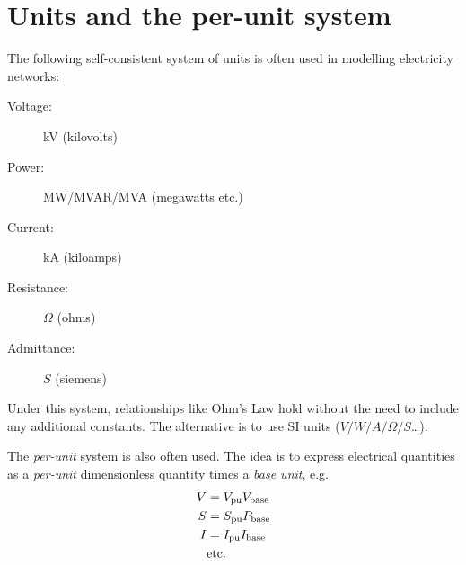 \documentclass[10pt]{article}
\begin{document}
\section{Units and the per-unit system}
The following self-consistent system of units is often used in modelling electricity networks:
\begin{description}
	\item[Voltage:]kV (kilovolts)
	\item[Power:]MW/MVAR/MVA (megawatts etc.)
	\item[Current:]kA (kiloamps)
	\item[Resistance:]$\Omega$ (ohms)
	\item[Admittance:]$S$ (siemens)
\end{description}
Under this system, relationships like Ohm's Law hold without the need to include any additional constants. The alternative is to use SI units ($V/W/A/\Omega/S$\ldots).

The \emph{per-unit} system is also often used. The idea is to express electrical quantities as a \emph{per-unit} dimensionless quantity times a \emph{base unit}, e.g.
\begin{align}
V &= V_\text{pu}V_\text{base} \notag \\
S &= S_\text{pu}P_\text{base} \notag \\
I &= I_\text{pu}I_\text{base} \notag \\
&\text{etc.}
\end{align}
\end{document}
